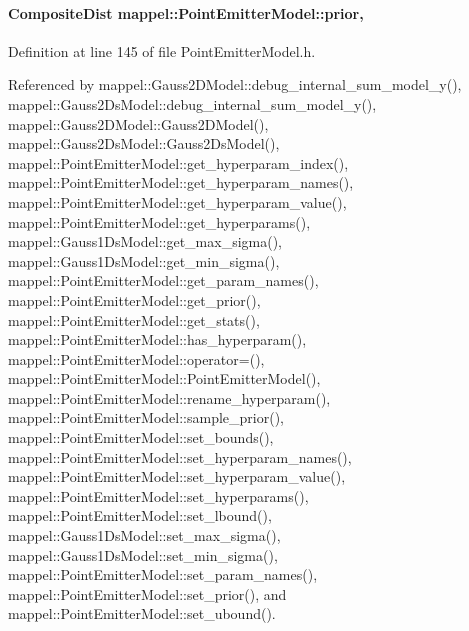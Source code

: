 \paragraph[{\texorpdfstring{prior}{prior}}]{\setlength{\rightskip}{0pt plus 5cm}Composite\+Dist mappel\+::\+Point\+Emitter\+Model\+::prior\hspace{0.3cm}{\ttfamily [protected]}, {\ttfamily [inherited]}}\hypertarget{classmappel_1_1PointEmitterModel_a393839f8eb1dd3d61c9369377742ba0e}{}\label{classmappel_1_1PointEmitterModel_a393839f8eb1dd3d61c9369377742ba0e}


Definition at line 145 of file Point\+Emitter\+Model.\+h.



Referenced by mappel\+::\+Gauss2\+D\+Model\+::debug\+\_\+internal\+\_\+sum\+\_\+model\+\_\+y(), mappel\+::\+Gauss2\+Ds\+Model\+::debug\+\_\+internal\+\_\+sum\+\_\+model\+\_\+y(), mappel\+::\+Gauss2\+D\+Model\+::\+Gauss2\+D\+Model(), mappel\+::\+Gauss2\+Ds\+Model\+::\+Gauss2\+Ds\+Model(), mappel\+::\+Point\+Emitter\+Model\+::get\+\_\+hyperparam\+\_\+index(), mappel\+::\+Point\+Emitter\+Model\+::get\+\_\+hyperparam\+\_\+names(), mappel\+::\+Point\+Emitter\+Model\+::get\+\_\+hyperparam\+\_\+value(), mappel\+::\+Point\+Emitter\+Model\+::get\+\_\+hyperparams(), mappel\+::\+Gauss1\+Ds\+Model\+::get\+\_\+max\+\_\+sigma(), mappel\+::\+Gauss1\+Ds\+Model\+::get\+\_\+min\+\_\+sigma(), mappel\+::\+Point\+Emitter\+Model\+::get\+\_\+param\+\_\+names(), mappel\+::\+Point\+Emitter\+Model\+::get\+\_\+prior(), mappel\+::\+Point\+Emitter\+Model\+::get\+\_\+stats(), mappel\+::\+Point\+Emitter\+Model\+::has\+\_\+hyperparam(), mappel\+::\+Point\+Emitter\+Model\+::operator=(), mappel\+::\+Point\+Emitter\+Model\+::\+Point\+Emitter\+Model(), mappel\+::\+Point\+Emitter\+Model\+::rename\+\_\+hyperparam(), mappel\+::\+Point\+Emitter\+Model\+::sample\+\_\+prior(), mappel\+::\+Point\+Emitter\+Model\+::set\+\_\+bounds(), mappel\+::\+Point\+Emitter\+Model\+::set\+\_\+hyperparam\+\_\+names(), mappel\+::\+Point\+Emitter\+Model\+::set\+\_\+hyperparam\+\_\+value(), mappel\+::\+Point\+Emitter\+Model\+::set\+\_\+hyperparams(), mappel\+::\+Point\+Emitter\+Model\+::set\+\_\+lbound(), mappel\+::\+Gauss1\+Ds\+Model\+::set\+\_\+max\+\_\+sigma(), mappel\+::\+Gauss1\+Ds\+Model\+::set\+\_\+min\+\_\+sigma(), mappel\+::\+Point\+Emitter\+Model\+::set\+\_\+param\+\_\+names(), mappel\+::\+Point\+Emitter\+Model\+::set\+\_\+prior(), and mappel\+::\+Point\+Emitter\+Model\+::set\+\_\+ubound().

